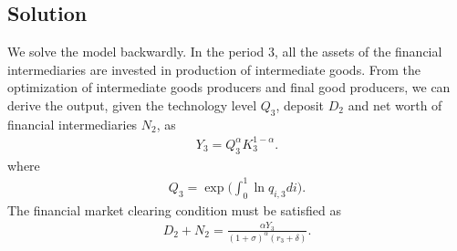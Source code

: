 \documentclass[a4paper,12pt]{article}
\begin{document}
\subsection{Solution}
We solve the model backwardly. In the period $3$, all the assets of the financial intermediaries are invested in production of intermediate goods. From the optimization of intermediate goods producers and final good producers, we can derive the output, given the technology level $Q_3$, deposit $D_2$ and net worth of financial intermediaries $N_2$, as
\begin{align}
    Y_3 = Q_3^\alpha K_3^{1-\alpha}.
\end{align}
where 
\begin{align}
    Q_3 = \exp\bigg( \int_0^1 \ln q_{i,3} di\bigg).
\end{align}
The financial market clearing condition must be satisfied as 
\begin{align}
    D_2 + N_2 = \frac{\alpha Y_3}{(1+\sigma)^\alpha(r_3+\delta)}.
\end{align}
\end{document}
